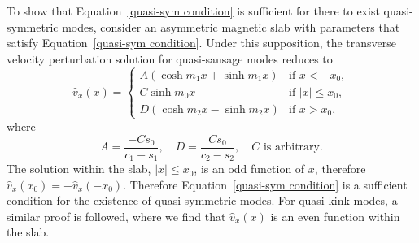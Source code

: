 \documentclass[12pt]{../style-files/ociamthesis}
\begin{document}
To show that Equation~\eqref{quasi-sym condition} is sufficient for there to exist quasi-symmetric modes, consider an asymmetric magnetic slab with parameters that satisfy Equation~\eqref{quasi-sym condition}. Under this supposition, the transverse velocity perturbation solution for quasi-sausage modes reduces to
\begin{equation}
\hat{v}_x(x) =
\begin{cases}
A(\cosh{m_1x} + \sinh{m_1x}) & \text{if } x < -x_0, \\
C\sinh{m_0x} & \text{if } |x| \leq x_0, \\
D(\cosh{m_2x} - \sinh{m_2x}) & \text{if  } x > x_0,
\end{cases}
\end{equation}
where
\begin{equation}
A = \frac{-Cs_0}{c_1 - s_1}, \quad
D = \frac{Cs_0}{c_2 - s_2}, \quad
C \text{ is arbitrary}.
\end{equation}
The solution within the slab, $|x| \leq x_0$, is an odd function of $x$, therefore $\hat{v}_x(x_0) = -\hat{v}_x(-x_0)$. Therefore Equation~\eqref{quasi-sym condition} is a sufficient condition for the existence of quasi-symmetric modes. For quasi-kink modes, a similar proof is followed, where we find that $\hat{v}_x(x)$ is an even function within the slab.
\end{document}
